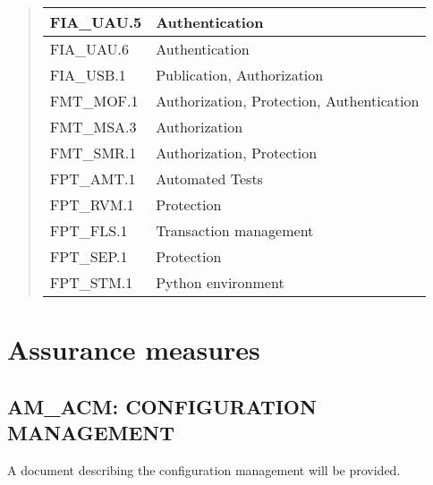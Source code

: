 \documentclass[10pt,a4paper,english]{book}
\newlength{\locallinewidth}
\begin{document}
\begin{quote}
\begin{longtable}[c]{|p{0.27\locallinewidth}|p{0.59\locallinewidth}|}
FIA{\_}UAU.5
 & 
Authentication
 \\
\hline

FIA{\_}UAU.6
 & 
Authentication
 \\
\hline

FIA{\_}USB.1
 & 
Publication, Authorization
 \\
\hline

FMT{\_}MOF.1
 & 
Authorization, Protection, Authentication
 \\
\hline

FMT{\_}MSA.3
 & 
Authorization
 \\
\hline

FMT{\_}SMR.1
 & 
Authorization, Protection
 \\
\hline

FPT{\_}AMT.1
 & 
Automated Tests
 \\
\hline

FPT{\_}RVM.1
 & 
Protection
 \\
\hline

FPT{\_}FLS.1
 & 
Transaction management
 \\
\hline

FPT{\_}SEP.1
 & 
Protection
 \\
\hline

FPT{\_}STM.1
 & 
Python environment
 \\
\hline
\end{longtable}
\end{quote}



\hypertarget{assurance-measures}{}
\section{Assurance measures}



\hypertarget{am-acm-configuration-management}{}
\subsection{AM{\_}ACM: CONFIGURATION MANAGEMENT}

A document describing the configuration management will be provided.


\end{document}
